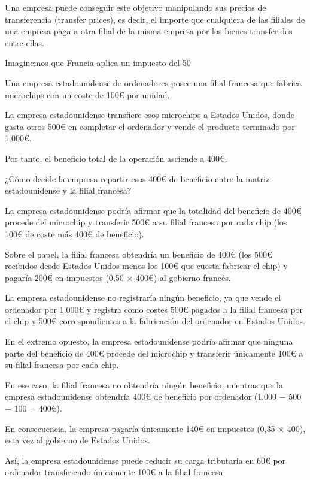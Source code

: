 \documentclass[10pt,a4paper]{article}
\begin{document}
Una empresa puede conseguir este objetivo manipulando sus precios de transferencia (transfer prices), es decir, el importe que cualquiera de las filiales de una empresa paga a otra filial de la misma empresa por los bienes transferidos entre ellas.

Imaginemos que Francia aplica un impuesto del 50 %

Una empresa estadounidense de ordenadores posee una filial francesa que fabrica microchips con un coste de 100€ por unidad.

La empresa estadounidense transfiere esos microchips a Estados Unidos, donde gasta otros 500€ en completar el ordenador y vende el producto terminado por 1.000€.

Por tanto, el beneficio total de la operación asciende a 400€.

¿Cómo decide la empresa repartir esos 400€ de beneficio entre la matriz estadounidense y la filial francesa?

La empresa estadounidense podría afirmar que la totalidad del beneficio de 400€ procede del microchip y transferir 500€ a su filial francesa por cada chip (los 100€ de coste más 400€ de beneficio).

Sobre el papel, la filial francesa obtendría un beneficio de 400€ (los 500€ recibidos desde Estados Unidos menos los 100€ que cuesta fabricar el chip) y pagaría 200€ en impuestos (0,50 × 400€) al gobierno francés.

La empresa estadounidense no registraría ningún beneficio, ya que vende el ordenador por 1.000€ y registra como costes 500€ pagados a la filial francesa por el chip y 500€ correspondientes a la fabricación del ordenador en Estados Unidos.

En el extremo opuesto, la empresa estadounidense podría afirmar que ninguna parte del beneficio de 400€ procede del microchip y transferir únicamente 100€ a su filial francesa por cada chip.

En ese caso, la filial francesa no obtendría ningún beneficio, mientras que la empresa estadounidense obtendría 400€ de beneficio por ordenador (1.000 − 500 − 100 = 400€).

En consecuencia, la empresa pagaría únicamente 140€ en impuestos (0,35 × 400), esta vez al gobierno de Estados Unidos.

Así, la empresa estadounidense puede reducir su carga tributaria en 60€ por ordenador transfiriendo únicamente 100€ a la filial francesa.
\end{document}
